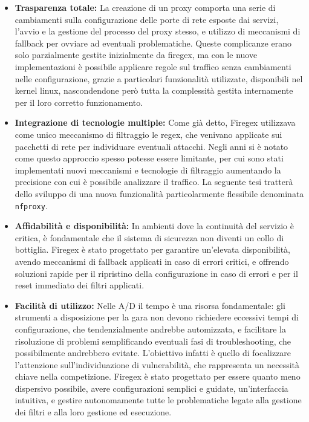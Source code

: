 \begin{itemize}
    \item \textbf{Trasparenza totale:} La creazione di un proxy comporta una serie di cambiamenti sulla configurazione delle porte di rete esposte dai servizi, l'avvio e la gestione del processo del proxy stesso, e utilizzo di meccanismi di fallback per ovviare ad eventuali problematiche. Queste complicanze erano solo parzialmente gestite inizialmente da firegex, ma con le nuove implementazioni è possibile applicare regole sul traffico senza cambiamenti nelle configurazione, grazie a particolari funzionalità utilizzate, disponibili nel kernel linux, nascondendone però tutta la complessità gestita internamente per il loro corretto funzionamento.
    \item \textbf{Integrazione di tecnologie multiple:} Come già detto, Firegex utilizzava come unico meccanismo di filtraggio le regex, che venivano applicate sui pacchetti di rete per individuare eventuali attacchi. Negli anni si è notato come questo approccio spesso potesse essere limitante, per cui sono stati implementati nuovi meccanismi e tecnologie di filtraggio aumentando la precisione con cui è possibile analizzare il traffico. La seguente tesi tratterà dello sviluppo di una nuova funzionalità particolarmente flessibile denominata \texttt{nfproxy}.
    \item \textbf{Affidabilità e disponibilità:} In ambienti dove la continuità del servizio è critica, è fondamentale che il sistema di sicurezza non diventi un collo di bottiglia. Firegex è stato progettato per garantire un’elevata disponibilità, avendo meccanismi di fallback applicati in caso di errori critici, e offrendo soluzioni rapide per il ripristino della configurazione in caso di errori e per il reset immediato dei filtri applicati.
    \item \textbf{Facilità di utilizzo:} Nelle A/D il tempo è una risorsa fondamentale: gli strumenti a disposizione per la gara non devono richiedere eccessivi tempi di configurazione, che tendenzialmente andrebbe automizzata, e facilitare la risoluzione di problemi semplificando eventuali fasi di troubleshooting, che possibilmente andrebbero evitate. L'obiettivo infatti è quello di focalizzare l'attenzione sull'individuazione di vulnerabilità, che rappresenta un necessità chiave nella competizione. Firegex è stato progettato per essere quanto meno dispersivo possibile, avere configurazioni semplici e guidate, un'interfaccia intuitiva, e gestire autonomamente tutte le problematiche legate alla gestione dei filtri e alla loro gestione ed esecuzione.
\end{itemize}

